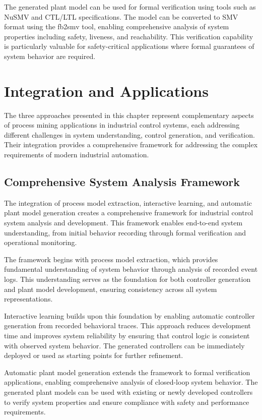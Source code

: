 The generated plant model can be used for formal verification using tools such as NuSMV and CTL/LTL specifications. The model can be converted to SMV format using the fb2smv tool, enabling comprehensive analysis of system properties including safety, liveness, and reachability. This verification capability is particularly valuable for safety-critical applications where formal guarantees of system behavior are required.

\section{Integration and Applications}

The three approaches presented in this chapter represent complementary aspects of process mining applications in industrial control systems, each addressing different challenges in system understanding, control generation, and verification. Their integration provides a comprehensive framework for addressing the complex requirements of modern industrial automation.

\subsection{Comprehensive System Analysis Framework}

The integration of process model extraction, interactive learning, and automatic plant model generation creates a comprehensive framework for industrial control system analysis and development. This framework enables end-to-end system understanding, from initial behavior recording through formal verification and operational monitoring.

The framework begins with process model extraction, which provides fundamental understanding of system behavior through analysis of recorded event logs. This understanding serves as the foundation for both controller generation and plant model development, ensuring consistency across all system representations.

Interactive learning builds upon this foundation by enabling automatic controller generation from recorded behavioral traces. This approach reduces development time and improves system reliability by ensuring that control logic is consistent with observed system behavior. The generated controllers can be immediately deployed or used as starting points for further refinement.

Automatic plant model generation extends the framework to formal verification applications, enabling comprehensive analysis of closed-loop system behavior. The generated plant models can be used with existing or newly developed controllers to verify system properties and ensure compliance with safety and performance requirements.

